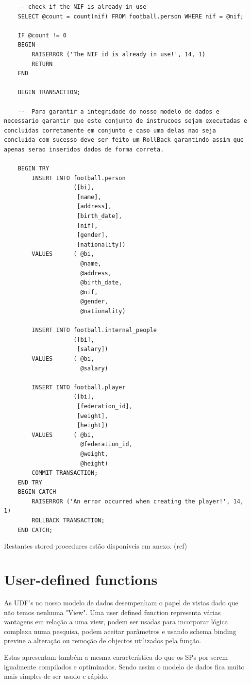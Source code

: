 \documentclass[pdftex,12pt,a4paper]{report}
\begin{document}
\begin{lstlisting}
	-- check if the NIF is already in use
	SELECT @count = count(nif) FROM football.person WHERE nif = @nif;

	IF @count != 0
	BEGIN
		RAISERROR ('The NIF id is already in use!', 14, 1)
		RETURN
	END

	BEGIN TRANSACTION;
	
	--  Para garantir a integridade do nosso modelo de dados e necessario garantir que este conjunto de instrucoes sejam executadas e concluidas corretamente em conjunto e caso uma delas nao seja concluida com sucesso deve ser feito um RollBack garantindo assim que apenas serao inseridos dados de forma correta.
	
	BEGIN TRY
		INSERT INTO football.person 
					([bi], 
					 [name], 
					 [address], 
					 [birth_date], 
					 [nif], 
					 [gender],
					 [nationality]) 
		VALUES      ( @bi, 
					  @name, 
					  @address, 
					  @birth_date, 
					  @nif, 
					  @gender,
					  @nationality) 

		INSERT INTO football.internal_people 
					([bi], 
					 [salary]) 
		VALUES      ( @bi, 
					  @salary) 

		INSERT INTO football.player 
					([bi], 
					 [federation_id], 
					 [weight],
					 [height]) 
		VALUES      ( @bi, 
					  @federation_id, 
					  @weight,
					  @height)
		COMMIT TRANSACTION;
	END TRY
	BEGIN CATCH
		RAISERROR ('An error occurred when creating the player!', 14, 1)
		ROLLBACK TRANSACTION;
	END CATCH;

\end{lstlisting}
 \vspace{0,5in}

Restantes stored procedures estão disponíveis em anexo. (ref)

\newpage
\section{User-defined functions}
As UDF's no nosso modelo de dados desempenham o papel de vistas dado que não temos nenhuma "View". Uma user defined function representa várias vantagens em relação a uma view, podem ser usadas para incorporar lógica complexa numa pesquisa, podem aceitar parâmetros e usando schema binding previne a alteração ou remoção de objectos utilizados pela função.

Estas apresentam também a mesma característica do que os SPs por serem igualmente compilados e optimizados. Sendo assim o modelo de dados fica muito mais simples de ser usado e rápido.
\end{document}

